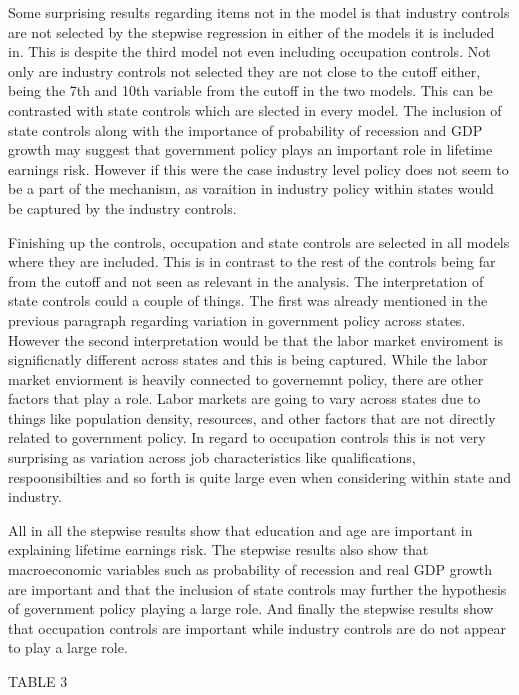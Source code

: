 \documentclass[12pt]{article}
\begin{document}
\begin{onehalfspace}
Some surprising results regarding items not in the model is that industry controls are not selected by the stepwise regression in either of the models it is included in. This is despite the third model not even including occupation controls. Not only are industry controls not selected they are not close to the cutoff either, being the 7th and 10th variable from the cutoff in the two models. This can be contrasted with state controls which are slected in every model. The inclusion of state controls along with the importance of probability of recession and GDP growth may suggest that government policy plays an important role in lifetime earnings risk. However if this were the case industry level policy does not seem to be a part of the mechanism, as varaition in industry policy within states would be captured by the industry controls.

Finishing up the controls, occupation and state controls are selected in all models where they are included. This is in contrast to the rest of the controls being far from the cutoff and not seen as relevant in the analysis. The interpretation of state controls could a couple of things. The first was already mentioned in the previous paragraph regarding variation in government policy across states. However the second interpretation would be that the labor market enviroment is significnatly different across states and this is being captured. While the labor market enviorment is heavily connected to governemnt policy, there are other factors that play a role. Labor markets are going to vary across states due to things like population density, resources, and other factors that are not directly related to government policy. In regard to occupation controls this is not very surprising as variation across job characteristics like qualifications, respoonsibilties and so forth is quite large even when considering within state and industry.

All in all the stepwise results show that education and age are important in explaining lifetime earnings risk. The stepwise results also show that macroeconomic variables such as probability of recession and real GDP growth are important and that the inclusion of state controls may further the hypothesis of government policy playing a large role. And finally the stepwise results show that occupation controls are important while industry controls are do not appear to play a large role.


TABLE 3




\end{onehalfspace}
\end{document}
